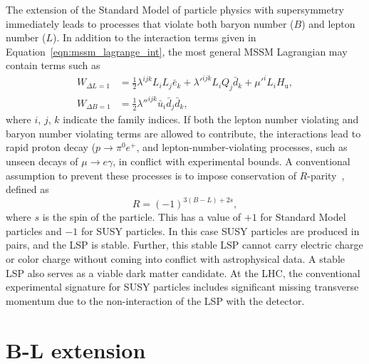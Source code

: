 The extension of the Standard Model of particle physics with supersymmetry
immediately leads to processes that violate both baryon number ($B$) and
lepton number ($L$).
In addition to the interaction terms given in
Equation~\ref{eqn:mssm_lagrange_int}, the most general MSSM Lagrangian may
contain terms such as
\begin{align}
    W_{\Delta L = 1} & =
    \frac{1}{2} \lambda^{ijk} L_{i} L_{j} \bar{e}_{k} +
    \lambda'^{ijk} L_{i} Q_{j} \bar{d}_{k} +
    \mu'^{i} L_{i} H_\mathrm{u},
    \label{eqn:rpv_terms_1}
    \\
    W_{\Delta B = 1} & =
    \frac{1}{2} \lambda''^{ijk} \bar{u}_{i} \bar{d}_{j} \bar{d}_{k},
    \label{eqn:rpv_terms_2}
\end{align}
where $i$, $j$, $k$ indicate the family indices.
If both the lepton number violating and baryon number violating terms are
allowed to contribute, the interactions lead to rapid proton decay
($p \to \pi^{0} e^{+}$, and lepton-number-violating processes, such
as unseen decays of $\mu \to e\gamma$, in conflict with experimental bounds.
A conventional assumption to prevent these processes is to impose
conservation of $R$-parity~\cite{Fayet:1976et,Fayet:1977yc,Farrar:1978xj,
Fayet:1979sa,Dimopoulos:1981zb},
defined as
\begin{equation}
  R=(-1)^{3(B-L)+2s},
\end{equation}
where $s$ is the spin of the particle.
This has a value of $+1$ for Standard Model particles and $-1$ for
SUSY particles.
In this case SUSY particles are produced in pairs, and the LSP is stable.
Further, this stable LSP cannot carry electric charge or color charge without
coming into conflict with astrophysical data.
A stable LSP also serves as a viable dark matter candidate.
At the LHC, the conventional experimental signature for SUSY particles
includes significant missing transverse momentum due to the non-interaction of
the LSP with the detector.

\FloatBarrier
\section{B-L extension}
\label{sec:theory_bl_extension}

